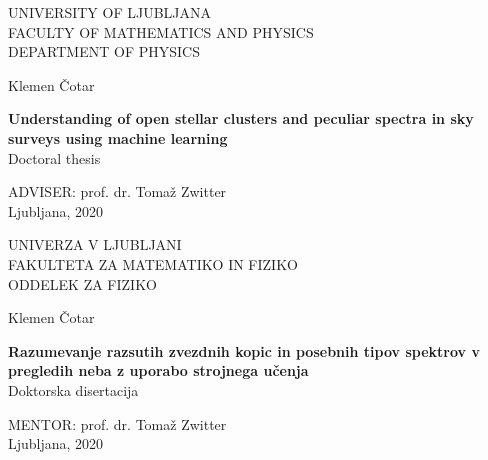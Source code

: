 \pagestyle{empty}
\begin{center}

{\large UNIVERSITY OF LJUBLJANA\\
FACULTY OF MATHEMATICS AND PHYSICS\\
DEPARTMENT OF PHYSICS\\}

\vspace{4cm}

{\Large Klemen Čotar\\}

\vspace{10mm}

{\bf \Large Understanding of open stellar clusters and peculiar spectra in sky surveys using machine learning}\\
\vspace{5mm}
{\sc Doctoral thesis}\\

\vfill

{\large ADVISER: prof. dr. Tomaž Zwitter\\

\vspace{2cm}
Ljubljana, 2020}

\end{center}


\cleardoublepage
\begin{center}

{\large UNIVERZA V LJUBLJANI\\
FAKULTETA ZA MATEMATIKO IN FIZIKO\\
ODDELEK ZA FIZIKO\\}

\vspace{4cm}

{\Large Klemen Čotar\\}

\vspace{10mm}

{\bf \Large Razumevanje razsutih zvezdnih kopic in posebnih tipov spektrov v pregledih neba z uporabo strojnega učenja}\\
\vspace{5mm}
{\sc Doktorska disertacija}\\

\vfill

{\large MENTOR: prof. dr. Tomaž Zwitter\\

\vspace{2cm}
Ljubljana, 2020}

\end{center}

